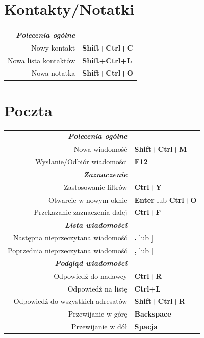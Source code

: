 \documentclass[12pt]{article}
\begin{document}
\begin{landscape}
\begin{center}
\begin{multicols}{2}
	\section*{Kontakty/Notatki}
	\begin{tabular*}{4in}{rp{1.5in}}
		\textit{\textbf{Polecenia ogólne}}	&					\\
		Nowy kontakt				& \textbf{Shift+Ctrl+C}			\\
		Nowa lista kontaktów			& \textbf{Shift+Ctrl+L}			\\
		Nowa notatka				& \textbf{Shift+Ctrl+O}			\\
	\end{tabular*}
	\section*{Poczta}
	\begin{tabular*}{4in}{rp{1.5in}}
		\textit{\textbf{Polecenia ogólne}}	&					\\
		Nowa wiadomość				& \textbf{Shift+Ctrl+M}			\\
		\vspace{1.5mm}
		Wysłanie/Odbiór wiadomości		& \textbf{F12}				\\
		\textit{\textbf{Zaznaczenie}}		&					\\
		Zastosowanie filtrów			& \textbf{Ctrl+Y}			\\
		Otwarcie w nowym oknie 			& \textbf{Enter} lub \textbf{Ctrl+O}	\\
		\vspace{1.5mm}
		Przekazanie zaznaczenia dalej		& \textbf{Ctrl+F}			\\
		\textit{\textbf{Lista wiadomości}}	&					\\
		Następna nieprzeczytana wiadomość	& \textbf{.} lub \textbf{]}		\\
		\vspace{1.5mm}
		Poprzednia nieprzeczytana wiadomość	& \textbf{,} lub \textbf{[}		\\
		\textit{\textbf{Podgląd wiadomości}}	&					\\
		Odpowiedź do nadawcy			& \textbf{Ctrl+R}			\\
		Odpowiedź na listę			& \textbf{Ctrl+L}			\\
		Odpowiedź do wszystkich adresatów	& \textbf{Shift+Ctrl+R}			\\
		Przewijanie w górę			& \textbf{Backspace}			\\
		Przewijanie w dół			& \textbf{Spacja}			\\
	\end{tabular*}

\end{multicols}
\end{center}
\end{landscape}
\end{document}
